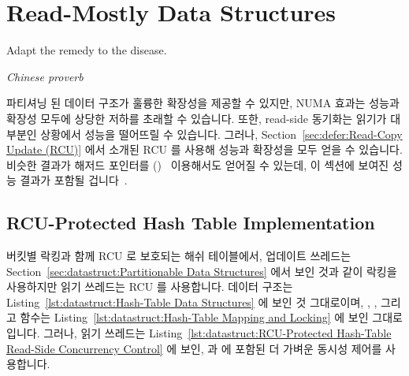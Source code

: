 \section{Read-Mostly Data Structures}
\label{sec:datastruct:Read-Mostly Data Structures}
%
\epigraph{Adapt the remedy to the disease.}{\emph{Chinese proverb}}

파티셔닝 된 데이터 구조가 훌륭한 확장성을 제공할 수 있지만, NUMA 효과는 성능과
확장성 모두에 상당한 저하를 초래할 수 있습니다.
또한, read-side 동기화는 읽기가 대부분인 상황에서 성능을 떨어뜨릴 수 있습니다.
그러나,
Section~\ref{sec:defer:Read-Copy Update (RCU)} 에서 소개된 RCU 를 사용해 성능과
확장성을 모두 얻을 수 있습니다.
비슷한 결과가 해저드 포인터를 ()~\cite{MagedMichael04a}
이용해서도 얻어질 수 있는데, 이 섹션에 보여진 성능 결과가 포함될
겁니다~\cite{McKenney:2013:SDS:2483852.2483867}.

\subsection{RCU-Protected Hash Table Implementation}
\label{sec:datastruct:RCU-Protected Hash Table Implementation}

버킷별 락킹과 함께 RCU 로 보호되는 해쉬 테이블에서, 업데이트 쓰레드는
Section~\ref{sec:datastruct:Partitionable Data Structures} 에서 보인 것과 같이
락킹을 사용하지만 읽기 쓰레드는 RCU 를 사용합니다.
데이터 구조는
Listing~\ref{lst:datastruct:Hash-Table Data Structures} 에 보인 것 그대로이며,
, , 그리고  함수는
Listing~\ref{lst:datastruct:Hash-Table Mapping and Locking} 에 보인
그대로입니다.
그러나, 읽기 쓰레드는
Listing~\ref{lst:datastruct:RCU-Protected Hash-Table Read-Side Concurrency Control}
에 보인,  과  에 포함된
더 가벼운 동시성 제어를 사용합니다.

